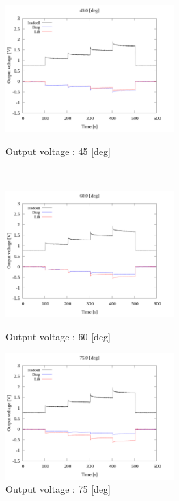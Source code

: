 \begin{figure}[htbp]
\begin{minipage}[b]{0.45\linewidth}
        \centering
        \includegraphics[width=65mm]{../../02_workspace/result/2-1/plot/01-3_allsensors/01_allsensors_450.png}
        \caption{Output voltage : 45 [deg]}
      \end{minipage}\\
      \begin{minipage}[b]{0.45\linewidth}
        \centering
        \includegraphics[width=65mm]{../../02_workspace/result/2-1/plot/01-3_allsensors/01_allsensors_600.png}
        \caption{Output voltage : 60 [deg]}
      \end{minipage}
      \begin{minipage}[b]{0.45\linewidth}
        \centering
        \includegraphics[width=65mm]{../../02_workspace/result/2-1/plot/01-3_allsensors/01_allsensors_750.png}
        \caption{Output voltage : 75 [deg]}
      \end{minipage} 
\end{figure}

